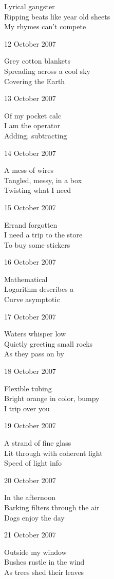 \documentclass[12pt]{article}
\begin{document}
Lyrical gangster \\
Ripping beats like year old sheets \\
My rhymes can't compete

12 October 2007

Grey cotton blankets \\
Spreading across a cool sky \\
Covering the Earth

13 October 2007

Of my pocket calc \\
I am the operator \\
Adding, subtracting

14 October 2007

A mess of wires \\
Tangled, messy, in a box \\
Twisting what I need

15 October 2007

Errand forgotten \\
I need a trip to the store \\
To buy some stickers

16 October 2007

Mathematical \\
Logarithm describes a  \\
Curve asymptotic

17 October 2007

Waters whisper low \\
Quietly greeting small rocks \\
As they pass on by

\newpage

18 October 2007

Flexible tubing \\
Bright orange in color, bumpy \\
I trip over you

19 October 2007

A strand of fine glass \\
Lit through with coherent light \\
Speed of light info

20 October 2007

In the afternoon \\
Barking filters through the air \\
Dogs enjoy the day

21 October 2007

Outside my window \\
Bushes rustle in the wind \\
As trees shed their leaves
\end{document}
